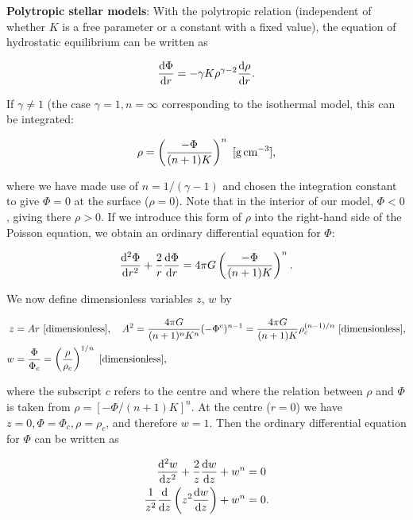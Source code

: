 \documentclass[a4paper,10pt]{article}
\begin{document}
{\noindent}\textbf{Polytropic stellar models}: With the polytropic relation (independent of whether $K$ is a free parameter or a constant with a fixed value), the equation of hydrostatic equilibrium can be written as

\begin{align*}
    \frac{{\rm d}\Phi}{{\rm d}r} = -\gamma K\rho^{\gamma-2} \frac{{\rm d}\rho}{{\rm d}r}.
\end{align*}

{\noindent}If $\gamma\neq1$ (the case $\gamma=1, n=\infty$ corresponding to the isothermal model, this can be integrated:

\begin{align*}
    \rho = \left( \frac{-\Phi}{(n+1)K} \right)^n ~ [{\rm g\,cm^{-3}}],
\end{align*}

{\noindent}where we have made use of $n=1/(\gamma-1)$ and chosen the integration constant to give $\Phi=0$ at the surface ($\rho=0$). Note that in the interior of our model, $\Phi<0$, giving there $\rho>0$. If we introduce this form of $\rho$ into the right-hand side of the Poisson equation, we obtain an ordinary differential equation for $\Phi$:

\begin{align*}
    \frac{{\rm d}^2\Phi}{{\rm d}r^2} + \frac{2}{r}\frac{{\rm d}\Phi}{{\rm d}r} = 4\pi G \left( \frac{-\Phi}{(n+1)K} \right)^n.
\end{align*}

{\noindent}We now define dimensionless variables $z$, $w$ by

\begin{align*}
    z &= Ar ~ [{\rm dimensionless}], ~~~ A^2 = \frac{4\pi G}{(n+1)^nK^n}(-\Phi^c)^{n-1} = \frac{4\pi G}{(n+1)K}\rho_c^{(n-1)/n} ~ [{\rm dimensionless}],\\
    w &= \frac{\Phi}{\Phi_c} = \left(\frac{\rho}{\rho_c}\right)^{1/n} ~ [{\rm dimensionless}],
\end{align*}

{\noindent}where the subscript $c$ refers to the centre and where the relation between $\rho$ and $\Phi$ is taken from $\rho=[-\Phi/(n+1)K]^n$. At the centre ($r=0$) we have $z=0, \Phi=\Phi_c, \rho=\rho_c$, and therefore $w=1$. Then the ordinary differential equation for $\Phi$ can be written as

\begin{align*}
    \frac{{\rm d}^2w}{{\rm d}z^2} +\frac{2}{z}\frac{{\rm d}w}{{\rm d}z} + w^n &= 0 \\
    \frac{1}{z^2}\frac{{\rm d}}{{\rm d}z} \left(z^2 \frac{{\rm d}w}{{\rm d}z}\right) + w^n &= 0.
\end{align*}
\end{document}
